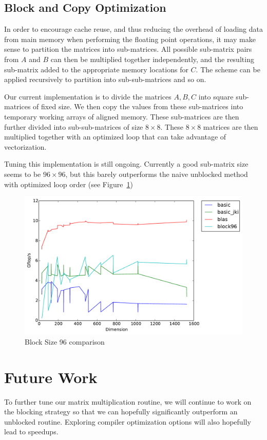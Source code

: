 \documentclass[fontsize=11pt]{scrartcl}
\numberwithin{equation}{section}        %
\numberwithin{figure}{section}          %
\numberwithin{table}{section}               %
\begin{document}
\subsection{Block and Copy Optimization}
In order to encourage cache reuse, and thus reducing the overhead of loading 
data from main memory when performing the floating point operations, it may make
sense to partition the matrices into sub-matrices.  All possible sub-matrix pairs
from $A$ and $B$ can then be multiplied together independently, and the resulting
sub-matrix added to the appropriate memory locations for $C$.  The scheme can be 
applied recursively to partition into sub-sub-matrices and so on.

Our current implementation is to divide the matrices $A, B, C$ into square sub-matrices
of fixed size.  We then copy the values from these sub-matrices into temporary working
arrays of aligned memory.  These sub-matrices are then further divided into sub-sub-matrices
of size $8 \times 8$.  These $8 \times 8$ matrices are then multiplied together with an 
optimized loop that can take advantage of vectorization.

Tuning this implementation is still ongoing.  Currently a good sub-matrix size seems
to be $96 \times 96$, but this barely outperforms the naive unblocked method with 
optimized loop order (see Figure~\ref{fig:block96})

\begin{figure}
    \centering
    \includegraphics[width=6.0in]{../timings/timing block96.pdf}
    \caption{Block Size 96 comparison}
    \label{fig:block96}
\end{figure}

\section{Future Work}

To further tune our matrix multiplication routine, we will continue to work on the 
blocking strategy so that we can hopefully significantly outperform an unblocked routine.
Exploring compiler optimization options will also hopefully lead to speedups.

\end{document}
